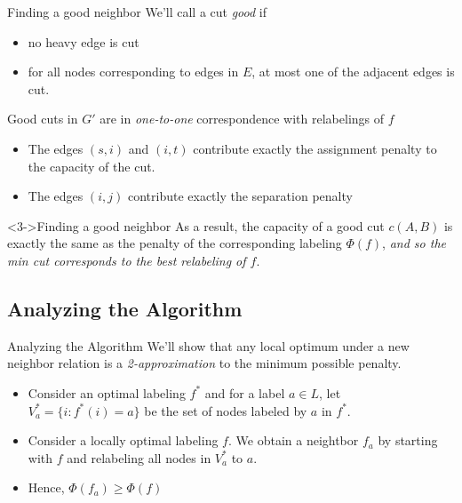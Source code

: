 \documentclass[10pt]{beamer}
\begin{document}
\begin{frame}{Finding a good neighbor}
	We'll call a cut \textit{good} if 
	\begin{itemize}
		\item<1-> no heavy edge is cut
		\item<1-> for all nodes corresponding to edges in $E$, at most one of the adjacent edges is cut.
	\end{itemize}
	Good cuts in $G'$ are in \textit{one-to-one} correspondence with relabelings of $f$
	\begin{itemize}
		\item<2-> The edges $(s, i)$ and $(i, t)$ contribute exactly the assignment penalty to the capacity of the cut.
		\item<2-> The edges $(i, j)$ contribute exactly the separation penalty
	\end{itemize}
	\begin{block}<3->{Finding a good neighbor}
		As a result, the capacity of a good cut $c(A, B)$ is exactly the same as the penalty of the corresponding labeling $\Phi(f)$, \textit{and so the min cut corresponds to the best relabeling of $f$}.
	\end{block}
\end{frame}

\subsection{Analyzing the Algorithm}
\begin{frame}{Analyzing the Algorithm}
	We'll show that any local optimum under a new neighbor relation is a \textit{2-approximation} to the minimum possible penalty.
	\begin{itemize}
		\item Consider an optimal labeling $f^*$ and for a label $a \in L$, let $V_a^* = \{i : f^*(i)=a\}$ be the set of nodes labeled by $a$ in $f^*$.
		\item Consider a locally optimal labeling $f$. We obtain a neightbor $f_a$ by starting with $f$ and relabeling all nodes in $V_a^*$ to $a$.
		\item Hence, $\Phi(f_a) \geq \Phi(f)$
	\end{itemize}
\end{frame}
\end{document}
